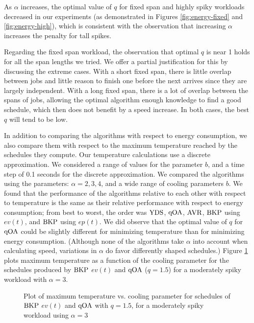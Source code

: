 \documentclass[11pt]{article}
\newcommand{\YDS}{{\rm YDS}}
\newcommand{\BKP}{{\rm BKP}}
\newcommand{\AVR}{{\rm AVR}}
\newcommand{\qOA}{{\rm qOA}}
\begin{document}
As $\alpha$ increases, the optimal value of $q$ 
for fixed span and highly spiky workloads decreased in our
experiments (as demonstrated in Figures 
\ref{fig:energy-fixed} and \ref{fig:energy-high}), which is consistent
with the observation that increasing $\alpha$ increases the penalty
for tall spikes.

Regarding the fixed span workload, the observation that optimal
$q$ is near 1 holds for all the span lengths we tried.
We offer a partial justification for this by discussing the extreme cases.
With a short fixed span, there is little overlap between jobs and
little reason to finish one before the next arrives since they are
largely independent.
With a long fixed span, there is a lot of overlap between the
spans of jobs, allowing the optimal algorithm enough knowledge
to find a good schedule, which then does not benefit by a speed increase.
In both cases, the best $q$ will tend to be low.

In addition to comparing the algorithms with respect to energy
consumption, we also compare them with respect to the maximum
temperature reached by the schedules they compute.
Our temperature calculations use a discrete approximation.
We considered a range of values for the parameter $b$, and a time step of 0.1
seconds for the discrete approximation.
We compared the algorithms using the parameters: $\alpha=2, 3, 4$,
and a wide range of cooling parameters $b$.
We found that the
performance of the algorithms relative to each other with respect to
temperature is the same as their relative performance with respect to
energy consumption; from best to worst, the order was $\YDS$, $\qOA$,
$\AVR$, $\BKP$ using $ev(t)$, and $\BKP$ using $ep(t)$.
We did observe that the optimal value of $q$ for $\qOA$ could be
slightly different for minimizing temperature than for minimizing
energy consumption.
(Although none of the algorithms take $\alpha$ into account when
calculating speed, variations in $\alpha$ do favor differently shaped
schedules.)
Figure \ref{fig:temperature_plot} plots maximum
temperature as a function of the cooling parameter for the schedules
produced by $\BKP$ $ev(t)$ and $\qOA$ ($q=1.5$) for a moderately
spiky workload with $\alpha=3$.

\begin{figure}
\centering
{}
\caption{Plot of maximum temperature vs. cooling parameter for schedules of $\BKP$ $ev(t)$ and $\qOA$ with $q=1.5$, for a moderately spiky workload using $\alpha=3$}
\label{fig:temperature_plot}
\end{figure}
\end{document}
